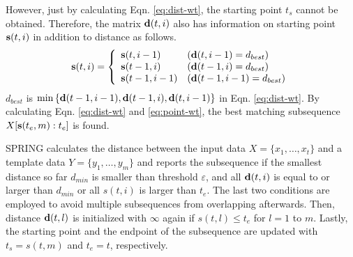 \documentclass{sigchi-ext}
\begin{document}
        However, just by calculating Eqn. \ref{eq:dist-wt}, the starting point $t_s$ cannot be obtained. Therefore, the matrix ${\bf d}(t,i)$ also has information on starting point ${\bf s}(t,i)$ in addition to distance as follows.
        \begin{eqnarray}
            \label{eq:point-wt}
            {\bf s}(t,i) =\left\{\begin{array}{ll}
                {\bf s}(t,i-1) & ({\bf d}(t,i-1) = d_{best} ) \\
                {\bf s}(t-1,i) & ({\bf d}(t-1,i) =  d_{best} ) \\
                {\bf s}(t-1,i-1) & ({\bf d}(t-1,i-1) = d_{best} )
            \end{array} \right.
        \end{eqnarray}
        $d_{best}$ is $\min{\{{\bf d}(t-1,i-1), {\bf d}(t-1,i), {\bf d}(t,i-1)\}}$ in Eqn. \ref{eq:dist-wt}. By calculating Eqn. \ref{eq:dist-wt} and \ref{eq:point-wt}, the best matching subsequence $X[{\bf s}(t_e,m):t_e]$ is found.
        

        SPRING calculates the distance between the input data $X=\{x_1,\dots,x_t\}$ and a template data $Y=\{y_1,\dots,y_m\}$ and reports the subsequence if the smallest distance so far $d_{min}$ is smaller than threshold $\varepsilon$, and all ${\bf d}(t,i)$ is equal to or larger than $d_{min}$ or all $s(t,i)$ is larger than $t_e$. The last two conditions are employed to avoid multiple subsequences from overlapping afterwards. Then, distance ${\bf d}(t,l)$ is initialized with $\infty$ again if $s(t,l)\leq t_e$ for $l=1$ to $m$. Lastly, the starting point and the endpoint of the subsequence are updated with $t_s=s(t,m)$ and $t_e=t$, respectively. 
        
\end{document}
